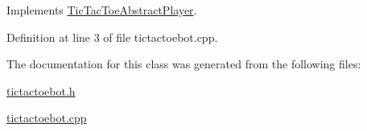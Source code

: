 Implements \hyperlink{class_tic_tac_toe_abstract_player_afccee4c01b399ecb12efc950474b6924}{Tic\+Tac\+Toe\+Abstract\+Player}.



Definition at line 3 of file tictactoebot.\+cpp.



The documentation for this class was generated from the following files\+:\begin{DoxyCompactItemize}
\item 
\hyperlink{tictactoebot_8h}{tictactoebot.\+h}\item 
\hyperlink{tictactoebot_8cpp}{tictactoebot.\+cpp}\end{DoxyCompactItemize}

